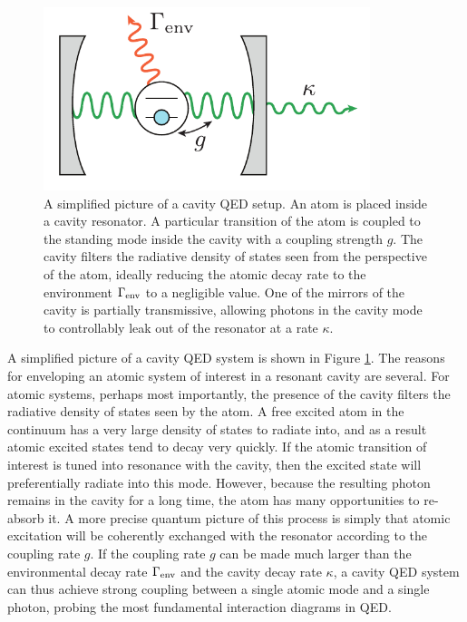 \begin{figure}
\begin{center}
	\includegraphics[width = 3.75in]{scqb_chapter/cav_QED}
\end{center}
\caption[Cavity QED schematic]{A simplified picture of a cavity QED setup.  An atom is placed inside a cavity resonator.  A particular transition of the atom is coupled to the standing mode inside the cavity with a coupling strength $g$.  The cavity filters the radiative density of states seen from the perspective of the atom, ideally reducing the atomic decay rate to the environment $\Gamma_{\rm env}$ to a negligible value.  One of the mirrors of the cavity is partially transmissive, allowing photons in the cavity mode to controllably leak out of the resonator at a rate $\kappa$.}
\label{fig:cav_QED}
\end{figure}

A simplified picture of a cavity QED system is shown in Figure \ref{fig:cav_QED}.  The reasons for enveloping an atomic system of interest in a resonant cavity are several.  For atomic systems, perhaps most importantly, the presence of the cavity filters the radiative density of states seen by the atom.  A free excited atom in the continuum has a very large density of states to radiate into, and as a result atomic excited states tend to decay very quickly.  If the atomic transition of interest is tuned into resonance with the cavity, then the excited state will preferentially radiate into this mode.  However, because the resulting photon remains in the cavity for a long time, the atom has many opportunities to re-absorb it.  A more precise quantum picture of this process is simply that atomic excitation will be coherently exchanged with the resonator according to the coupling rate $g$.  If the coupling rate $g$ can be made much larger than the environmental decay rate $\Gamma_{\rm env}$ and the cavity decay rate $\kappa$, a cavity QED system can thus achieve strong coupling between a single atomic mode and a single photon, probing the most fundamental interaction diagrams in QED.

